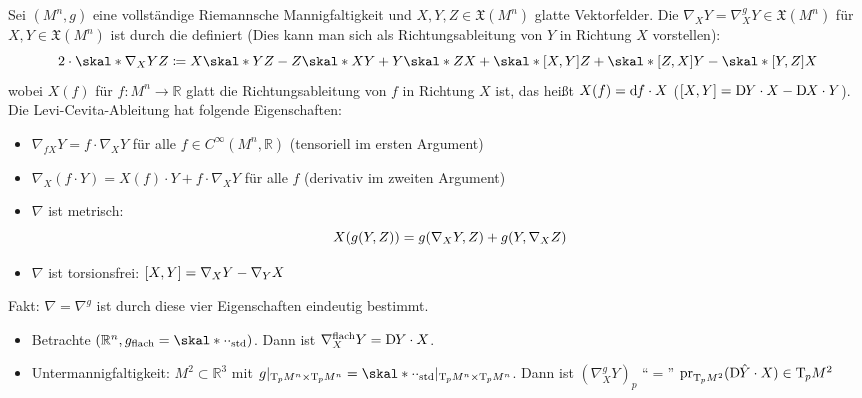 \begin{erinnerung}[{name=[Levi-Civita-Ableitung]}]
	Sei $(M^n,g)$ eine vollständige Riemannsche Mannigfaltigkeit und $X,Y,Z \in \mathfrak{X}(M^n)$ glatte Vektorfelder.
	Die  $\nabla_X Y = \nabla^g_X Y \in \mathfrak{X}(M^n)$ für $X,Y \in \mathfrak{X}(M^n)$ ist durch die  definiert (Dies kann man sich als Richtungsableitung von $Y$ in Richtung $X$ vorstellen):
	\[
		2 \cdot \skal*{\nabla_X Y}{Z} \coloneqq X \skal*{Y}{Z} - Z \skal*{X}{Y} + Y \skal*{Z}{X} + \skal*{\benbrace*{X,Y}}{Z} + \skal*{\benbrace*{Z,X}}{Y} - \skal*{\benbrace*{Y,Z}}{X}
	\]
	wobei $X(f)$ für $f \colon M^n \to \mathbb{R}$ glatt die Richtungsableitung von $f$ in Richtung $X$ ist, das heißt $X(f) = \mathd f \cdot X$ ($\benbrace*{X,Y} = \D Y \cdot X - \D X \cdot Y$).
	Die Levi-Cevita-Ableitung hat folgende Eigenschaften:
	\begin{itemize}
		\item $\nabla_{f X} Y = f \cdot \nabla_X Y$ für alle $f \in C^\infty(M^n,\mathbb{R})$ (tensoriell im ersten Argument)
		\item $\nabla_X(f \cdot Y) = X(f) \cdot Y + f \cdot \nabla_X Y $ für alle $f$ (derivativ im zweiten Argument)
		\item $\nabla$ ist metrisch:
		\[
			X \enbrace*{g(Y,Z)} = g \enbrace*{\nabla_X Y,Z} + g \enbrace*{Y,\nabla_X Z}
		\]
		\item $\nabla$ ist torsionsfrei: $\benbrace*{X,Y} = \nabla_X Y - \nabla_Y X$
	\end{itemize}
	Fakt: $\nabla=\nabla^g$ ist durch diese vier Eigenschaften eindeutig bestimmt.
\end{erinnerung}

\begin{beispiel*}[{name=[für Levi-Cevita-Ableitung]}]
	\begin{itemize}
		\item Betrachte $(\mathbb{R}^n,g_\mathrm{flach} = \skal*{\cdot}{\cdot}_\mathrm{std})$.
		Dann ist $\nabla^\mathrm{flach}_X Y = \D Y \cdot X$.
		\item Untermannigfaltigkeit: $M^2 \subset \mathbb{R}^3$ mit $g |_{\Tmap_p M^n \times \Tmap_p M^n} = \skal*{\cdot }{\cdot }_\mathrm{std} |_{\Tmap_p M^n \times \Tmap_p M^n}$.
		Dann ist $(\nabla_X^g Y)_p$ \enquote{$=$} $\pr_{\Tmap_p M^2}(\D \hat{Y} \cdot X) \in \Tmap_pM^2$
	\end{itemize}
\end{beispiel*}

